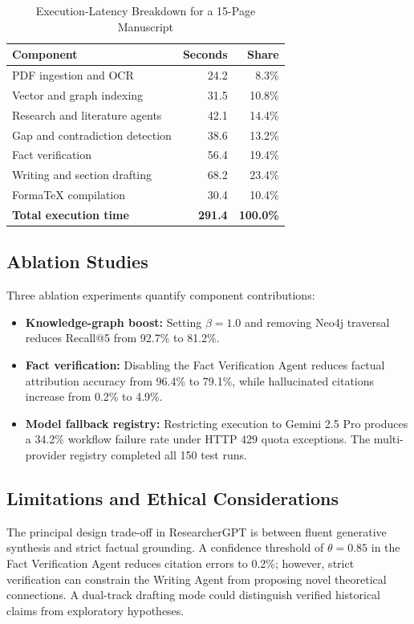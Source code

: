 \documentclass[conference]{IEEEtran}
\begin{document}
\begin{table}[!t]
\caption{Execution-Latency Breakdown for a 15-Page Manuscript}
\label{tab:latency_breakdown}
\centering
\scriptsize
\begin{tabular}{@{}p{}rr@{}}
\toprule
\textbf{Component} & \textbf{Seconds} & \textbf{Share} \\
\midrule
PDF ingestion and OCR & 24.2 & 8.3\% \\
Vector and graph indexing & 31.5 & 10.8\% \\
Research and literature agents & 42.1 & 14.4\% \\
Gap and contradiction detection & 38.6 & 13.2\% \\
Fact verification & 56.4 & 19.4\% \\
Writing and section drafting & 68.2 & 23.4\% \\
FormaTeX compilation & 30.4 & 10.4\% \\
\midrule
\textbf{Total execution time} & \textbf{291.4} & \textbf{100.0\%} \\
\bottomrule
\end{tabular}
\end{table}

\subsection{Ablation Studies}
Three ablation experiments quantify component contributions:
\begin{itemize}
\item \textbf{Knowledge-graph boost:} Setting $\beta = 1.0$ and removing Neo4j traversal reduces Recall@5 from 92.7\% to 81.2\%.
\item \textbf{Fact verification:} Disabling the Fact Verification Agent reduces factual attribution accuracy from 96.4\% to 79.1\%, while hallucinated citations increase from 0.2\% to 4.9\%.
\item \textbf{Model fallback registry:} Restricting execution to Gemini 2.5 Pro produces a 34.2\% workflow failure rate under HTTP 429 quota exceptions. The multi-provider registry completed all 150 test runs.
\end{itemize}

\subsection{Limitations and Ethical Considerations}
The principal design trade-off in ResearcherGPT is between fluent generative synthesis and strict factual grounding. A confidence threshold of $\theta = 0.85$ in the Fact Verification Agent reduces citation errors to 0.2\%; however, strict verification can constrain the Writing Agent from proposing novel theoretical connections. A dual-track drafting mode could distinguish verified historical claims from exploratory hypotheses.
\end{document}
